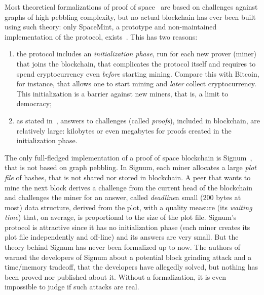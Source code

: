 Most theoretical formalizations of proof of space~\cite{AtenieseBFG14,DziembowskiFKP15,RenD16} are
based on challenges against graphs of high pebbling complexity, but
no actual blockchain has ever been built using such theory: only SpaceMint, a prototype and non-maintained
implementation of the protocol, exists~\cite{ParkKFGAP18}. This has two reasons:
%
\begin{enumerate}
\item the protocol includes an \emph{initialization phase},
  run for each new prover (miner) that joins the blockchain,
  that complicates the protocol itself and
  requires to spend cryptocurrency even \emph{before}
  starting mining. Compare this with Bitcoin, for instance, that allows one to start mining
  and \emph{later} collect cryptocurrency. This initialization is a barrier against new
  miners, that is, a limit to democracy;
\item as stated in~\cite{AbusalahACKPR17}, answers to challenges (called \emph{proofs}),
  included in blockchain, are relatively large:
  kilobytes or even megabytes for proofs created in the initialization phase.
\end{enumerate}
%
The only full-fledged implementation of a proof of space blockchain is Signum~\cite{Signum},
that is not based on graph pebbling.
In Signum, each miner allocates a large \emph{plot file} of hashes, that is not shared nor
stored in blockchain.
A peer that wants to mine the next block derives a challenge from the current head of the blockchain
and challenges the miner for an answer, called
\emph{deadline}\ie a small ($200$ bytes at most) data structure, derived from the plot, with a quality measure
(its \emph{waiting time}) that, on average, is proportional to the size of the plot file.
Signum's protocol is attractive since it has no initialization phase (each miner creates its plot file
independently and off-line) and its answers are very small.
But the theory behind Signum has never been formalized up to now.
The authors of~\cite{ParkKFGAP18} warned the developers of Signum about a potential block grinding attack and
a time/memory tradeoff, that the developers have allegedly solved,
but nothing has been proved nor published about it. Without a formalization, it is
even impossible to judge if such attacks are real.

